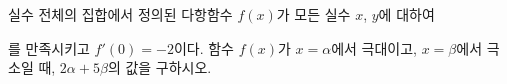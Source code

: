 실수 전체의 집합에서 정의된 다항함수 $f(x)$가 모든 실수 $x$, $y$에 대하여\par\smallskip{}\par\smallskip\noindent 를 만족시키고 $f'(0)=-2$이다. 함수 $f(x)$가 $x=\alpha$에서 극대이고, $x=\beta$에서 극소일 때, $2\alpha+5\beta$의 값을 구하시오.
